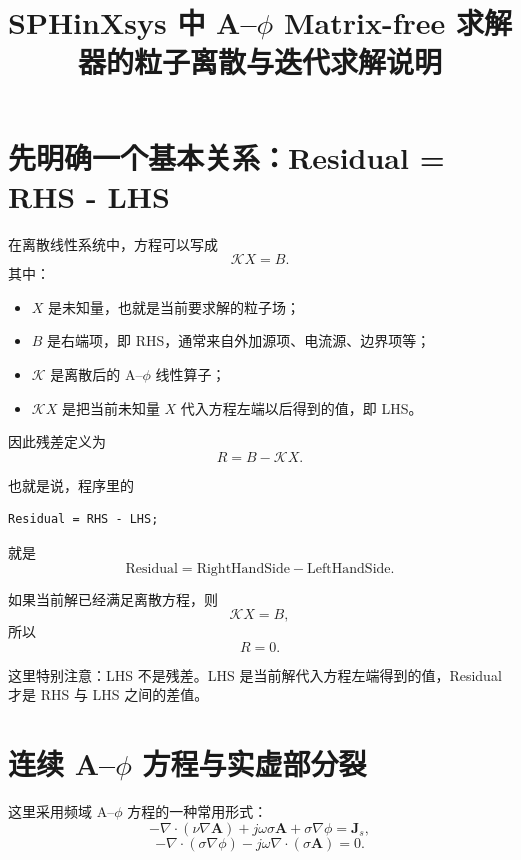 \documentclass[UTF8,11pt]{ctexart}
\title{SPHinXsys 中 A--$\phi$ Matrix-free 求解器的粒子离散与迭代求解说明}
\author{}
\date{}
\begin{document}
\maketitle

\section{先明确一个基本关系：Residual = RHS - LHS}

在离散线性系统中，方程可以写成
\begin{equation}
    \mathcal{K} X = B .
\end{equation}
其中：
\begin{itemize}
    \item $X$ 是未知量，也就是当前要求解的粒子场；
    \item $B$ 是右端项，即 RHS，通常来自外加源项、电流源、边界项等；
    \item $\mathcal{K}$ 是离散后的 A--$\phi$ 线性算子；
    \item $\mathcal{K}X$ 是把当前未知量 $X$ 代入方程左端以后得到的值，即 LHS。
\end{itemize}

因此残差定义为
\begin{equation}
    R = B - \mathcal{K}X .
\end{equation}

也就是说，程序里的
\begin{lstlisting}
Residual = RHS - LHS;
\end{lstlisting}
就是
\begin{equation}
    \mathrm{Residual} = \mathrm{RightHandSide} - \mathrm{LeftHandSide}.
\end{equation}

如果当前解已经满足离散方程，则
\begin{equation}
    \mathcal{K}X = B,
\end{equation}
所以
\begin{equation}
    R = 0 .
\end{equation}

这里特别注意：LHS 不是残差。LHS 是当前解代入方程左端得到的值，Residual 才是 RHS 与 LHS 之间的差值。

\section{连续 A--$\phi$ 方程与实虚部分裂}

这里采用频域 A--$\phi$ 方程的一种常用形式：
\begin{equation}
    -\nabla\cdot(\nu\nabla \bm A)
    + j\omega\sigma \bm A
    + \sigma\nabla \phi
    = \bm J_s ,
    \label{eq:continuous-a}
\end{equation}
\begin{equation}
    -\nabla\cdot(\sigma\nabla \phi)
    - j\omega\nabla\cdot(\sigma \bm A)
    = 0 .
    \label{eq:continuous-phi}
\end{equation}
\end{document}
